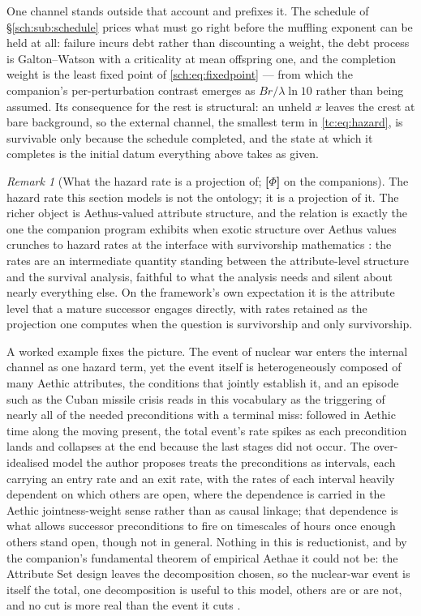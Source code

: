 \documentclass[11pt]{article}
\numberwithin{equation}{section}
\theoremstyle{plain}
\theoremstyle{definition}
\theoremstyle{remark}
\newtheorem{remark}[theorem]{Remark}
\begin{document}
One channel stands outside that account and prefixes it. The schedule of
\S\ref{sch:sub:schedule} prices what must go right before the muffling
exponent can be held at all: failure incurs debt rather than discounting a
weight, the debt process is Galton--Watson with a criticality at mean
offspring one, and the completion weight is the least fixed point of
\eqref{sch:eq:fixedpoint} --- from which the companion's per-perturbation
contrast emerges as $Br/\lambda\ln10$ rather than being assumed. Its
consequence for the rest is structural: an unheld $x$ leaves the crest at
bare background, so the external channel, the smallest term in
\eqref{tc:eq:hazard}, is survivable only because the schedule
completed, and the state at which it completes is the initial datum
everything above takes as given.

\begin{remark}[What the hazard rate is a projection of; \textbf{[$\Phi$]} on the companions]
\label{gr1:rem:aethicsubstrate}
The hazard rate this section models is not the ontology; it is a
projection of it. The richer object is Aethus-valued attribute
structure, and the relation is exactly the one the companion program
exhibits when exotic structure over Aethus values crunches to hazard
rates at the interface with survivorship mathematics \cite{Nexus}:
the rates are an intermediate quantity standing between the
attribute-level structure and the survival analysis, faithful to what
the analysis needs and silent about nearly everything else. On the
framework's own expectation it is the attribute level that a mature
successor engages directly, with rates retained as the projection one
computes when the question is survivorship and only survivorship.

A worked example fixes the picture. The event of nuclear war enters
the internal channel as one hazard term, yet the event itself is
heterogeneously composed of many Aethic attributes, the conditions
that jointly establish it, and an episode such as the Cuban missile
crisis reads in this vocabulary as the triggering of nearly all of
the needed preconditions with a terminal miss: followed in Aethic
time along the moving present, the total event's rate spikes as each
precondition lands and collapses at the end because the last stages
did not occur. The over-idealised model the author proposes treats
the preconditions as intervals, each carrying an entry rate and an
exit rate, with the rates of each interval heavily dependent on which
others are open, where the dependence is carried in the Aethic
jointness-weight sense rather than as causal linkage; that dependence
is what allows successor preconditions to fire on timescales of hours
once enough others stand open, though not in general. Nothing in this
is reductionist, and by the companion's fundamental theorem of
empirical Aethae it could not be: the Attribute Set design leaves the
decomposition chosen, so the nuclear-war event is itself the total,
one decomposition is useful to this model, others are or are not, and
no cut is more real than the event it cuts \cite{Aethus}.


\end{remark}
\end{document}
